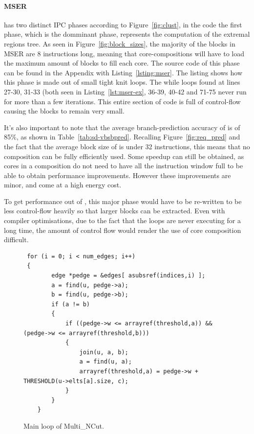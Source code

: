 \paragraph{MSER}
 has two distinct IPC phases according to Figure~\ref{fig:clust}, in the code the first phase, which is the domminant phase, represents the computation of the extremal regions tree.
As seen in Figure~\ref{fig:block_sizes}, the majority of the blocks in MSER are 8 instructions long, meaning that core-compositions will have to load the maximum amount of blocks to fill each core.
The source code of this phase can be found in the Appendix with Listing~\ref{lsting:mser}.
The listing shows how this phase is made out of small tight knit loops.
The while loops found at lines 27-30, 31-33 (both seen in Listing~\ref{lst:mser-ex}, 36-39, 40-42 and 71-75 never run for more than a few iterations.
This entire section of code is full of control-flow causing the blocks to remain very small.

It's also important to note that the average branch-prediction accuracy of  is of 85\%, as shown in Table~\ref{tab:sd-vbsbpred}.
Recalling Figure~\ref{fig:req_pred} and the fact that the average block size of  is under 32 instructions, this means that no composition can be fully efficiently used.
Some speedup can still be obtained, as cores in a composition do not need to have all the instruction window full to be able to obtain performance improvements.
However these improvements are minor, and come at a high energy cost.

To get performance out of , this major phase would have to be re-written to be less control-flow heavily so that larger blocks can be extracted.
Even with compiler optimisations, due to the fact that the loops are never executing for a long time, the amount of control flow would render the use of core composition difficult.

\begin{figure}[t]
\lstset{language=C,numbersep=4pt}
\begin{center}
\begin{lstlisting}
 for (i = 0; i < num_edges; i++) 
 {
        edge *pedge = &edges[ asubsref(indices,i) ];
		a = find(u, pedge->a);
        b = find(u, pedge->b);
        if (a != b) 
		{
            if ((pedge->w <= arrayref(threshold,a)) && (pedge->w <= arrayref(threshold,b))) 
			{
	            join(u, a, b);
	            a = find(u, a);
	            arrayref(threshold,a) = pedge->w + THRESHOLD(u->elts[a].size, c);
            }
        }
    }
\end{lstlisting}
\end{center}
\vspace{-1em}
\caption{Main loop of Multi\_NCut.}
\label{lst:multi_loop}
\vspace{1em}
\end{figure}

